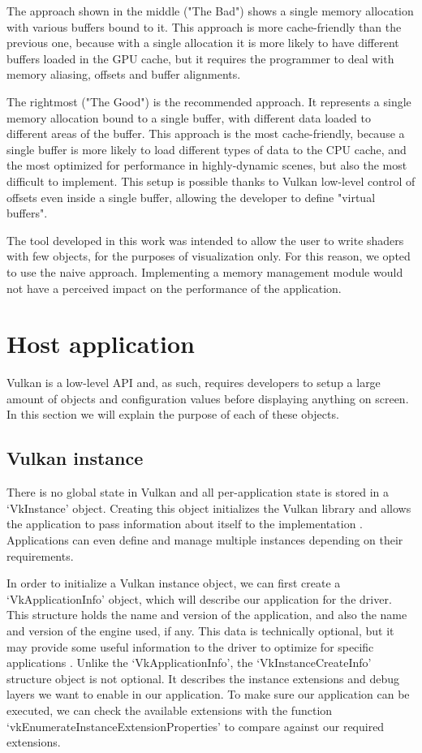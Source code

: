 The approach shown in the middle ("The Bad") shows a single memory allocation with various buffers bound to it. This approach is more cache-friendly than the previous one, because with a single allocation it is more likely to have different buffers loaded in the GPU cache, but it requires the programmer to deal with memory aliasing, offsets and buffer alignments.

The rightmost ("The Good") is the recommended approach. It represents a single memory allocation bound to a single buffer, with different data loaded to different areas of the buffer. This approach is the most cache-friendly, because a single buffer is more likely to load different types of data to the CPU cache, and the most optimized for performance in highly-dynamic scenes, but also the most difficult to implement. This setup is possible thanks to Vulkan low-level control of offsets even inside a single buffer, allowing the developer to define "virtual buffers".

The tool developed in this work was intended to allow the user to write shaders with few objects, for the purposes of visualization only. For this reason, we opted to use the naive approach. Implementing a memory management module would not have a perceived impact on the performance of the application.

\section{Host application}
Vulkan is a low-level API and, as such, requires developers to setup a large amount of objects and configuration values before displaying anything on screen. In this section we will explain the purpose of each of these objects.

\subsection{Vulkan instance}
There is no global state in Vulkan and all per-application state is stored in a `VkInstance' object. Creating this object initializes the Vulkan library and allows the application to pass information about itself to the implementation \cite{vulkan_docs}. Applications can even define and manage multiple instances depending on their requirements.

In order to initialize a Vulkan instance object, we can first create a `VkApplicationInfo' object, which will describe our application for the driver. This structure holds the name and version of the application, and also the name and version of the engine used, if any. This data is technically optional, but it may provide some useful information to the driver to optimize for specific applications \cite{vulkan_tutorial}. Unlike the `VkApplicationInfo', the `VkInstanceCreateInfo' structure object is not optional. It describes the instance extensions and debug layers we want to enable in our application. To make sure our application can be executed, we can check the available extensions with the function `vkEnumerateInstanceExtensionProperties' to compare against our required extensions.

